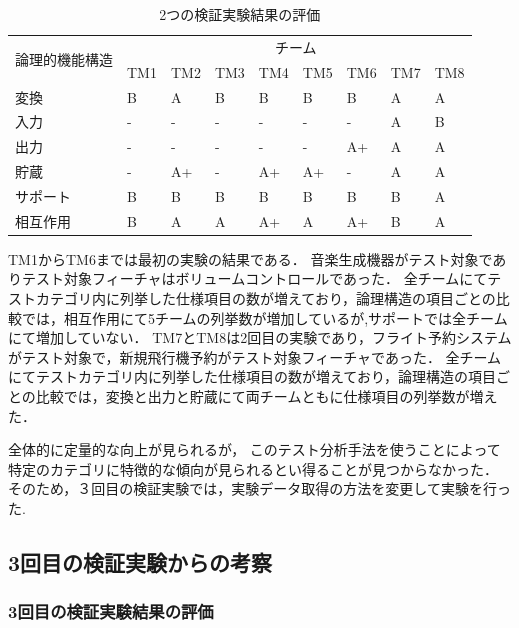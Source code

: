 \documentclass[10pt,a4j]{jarticle}
\begin{document}
\begin{table}[htbp]
\footnotesize
  \centering
  \caption{2つの検証実験結果の評価}
    \begin{tabular}{|l|l|l|l|l|l|l|l|l|}
    \hline
    \multicolumn{1}{|c|}{\multirow{2}[4]{*}{論理的機能構造}} & \multicolumn{8}{c|}{チーム} \bigstrut\\
\cline{2-9}          & TM1   & TM2   & TM3   & TM4   & TM5   & TM6 & TM7 & TM8 \bigstrut\\
    \hline
    変換  & B     & A     & B     & B     & B     & B & A     & A\bigstrut\\
    \hline
    入力 &  -     &   -     &   -    &   -    &   -    & -     & A     & B   \bigstrut\\
    \hline
    出力 & -     & -     & -     & -     & -     & A+ & A     & A \bigstrut\\
    \hline
    貯蔵 & -     & A+    & -     & A+    & A+    & -& A     & A  \bigstrut\\
    \hline
    サポート & B     & B     & B     & B     & B     & B& B     & A \bigstrut[t]\\
    \hline
    相互作用  & B     & A     & A     & A+    & A     & A+& B     & A \bigstrut[b]\\
    \hline
    \end{tabular}%
  \label{tbl:D-3-tbl5}%
\end{table}%

TM1からTM6までは最初の実験の結果である．
音楽生成機器がテスト対象でありテスト対象フィーチャはボリュームコントロールであった．
全チームにてテストカテゴリ内に列挙した仕様項目の数が増えており，論理構造の項目ごとの比較では，相互作用にて5チームの列挙数が増加しているが,サポートでは全チームにて増加していない．
TM7とTM8は2回目の実験であり，フライト予約システムがテスト対象で，新規飛行機予約がテスト対象フィーチャであった． 
全チームにてテストカテゴリ内に列挙した仕様項目の数が増えており，論理構造の項目ごとの比較では，変換と出力と貯蔵にて両チームともに仕様項目の列挙数が増えた．

全体的に定量的な向上が見られるが， このテスト分析手法を使うことによって特定のカテゴリに特徴的な傾向が見られるとい得ることが見つからなかった．
そのため，３回目の検証実験では，実験データ取得の方法を変更して実験を行った.

\subsection{3回目の検証実験からの考察}
\subsubsection{3回目の検証実験結果の評価} \label{sec:3-2}
\end{document}
